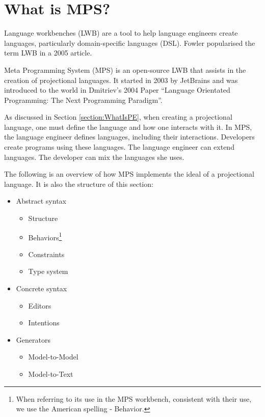 \section{What is MPS?}
\label{section:MPS}

Language workbenches (LWB) are a tool to help language engineers create languages, particularly domain-specific languages (DSL).
Fowler\cite{Fowler_lwb} popularised the term LWB in a 2005 article.

Meta Programming System (MPS) is an open-source LWB that assists in the creation of projectional languages.
It started in 2003 by JetBrains and was introduced to the world in Dmitriev's 2004 Paper ``Language Orientated Programming: The Next Programming Paradigm''\cite{dmitriev2004language}.

As discussed in Section \ref{section:WhatIsPE}, when creating a projectional language, one must define the language and how one interacts with it.
In MPS, the language engineer defines languages, including their interactions.
Developers create programs using these languages.
The language engineer can extend languages.
The developer can mix the languages she uses.

The following is an overview of how MPS implements the ideal of a projectional language.
It is also the structure of this section: 

\begin{itemize}
    \setlength\itemsep{0em}
    \item Abstract syntax
    \begin{itemize}
        \setlength\itemsep{0em}
        \item Structure
        \item Behaviors\footnote{When referring to its use in the MPS workbench, consistent with their use, we use the American spelling - Behavior.}
        \item Constraints
        \item Type system
    \end{itemize}
    \item Concrete syntax
    \begin{itemize}
        \setlength\itemsep{0em}
        \item Editors
        \item Intentions
    \end{itemize}
    \item Generators
    \begin{itemize}
        \setlength\itemsep{0em}
        \item Model-to-Model
        \item Model-to-Text
    \end{itemize}
\end{itemize}

